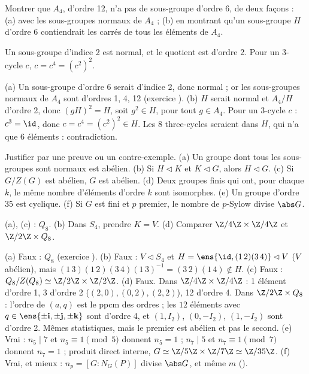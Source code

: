 \begin{exo}\label{exo-a4}
Montrer que $A_4$, d'ordre 12, n'a pas de sous-groupe d'ordre 6, de deux façons : (a) avec les sous-groupes normaux de $A_4$ ; (b) en montrant qu'un sous-groupe $H$ d'ordre 6 contiendrait les carrés de tous les éléments de $A_4$.
\begin{indication}
Un sous-groupe d'indice 2 est normal, et le quotient est d'ordre 2. Pour un 3-cycle $c$, $c=c^4=(c^2)^2$.
\end{indication}
\begin{corrige}
(a) Un sous-groupe d'ordre 6 serait d'indice 2, donc normal ; or les sous-groupes normaux de $A_4$ sont d'ordres 1, 4, 12 (exercice ).
(b) $H$ serait normal et $A_4/H$ d'ordre 2, donc $(gH)^2=H$, soit $g^2\in H$, pour tout $g\in A_4$. Pour un 3-cycle $c$ : $c^3=\id$, donc $c=c^4=(c^2)^2\in H$. Les 8 three-cycles seraient dans $H$, qui n'a que 6 éléments : contradiction.
\end{corrige}
\end{exo}

\begin{exo}\label{exo-vf-groupes}
Justifier par une preuve ou un contre-exemple. (a) Un groupe dont tous les sous-groupes sont normaux est abélien. (b) Si $H\lhd K$ et $K\lhd G$, alors $H\lhd G$. (c) Si $G/Z(G)$ est abélien, $G$ est abélien. (d) Deux groupes finis qui ont, pour chaque $k$, le même nombre d'éléments d'ordre $k$ sont isomorphes. (e) Un groupe d'ordre 35 est cyclique. (f) Si $G$ est fini et $p$ premier, le nombre de $p$-Sylow divise $\abs G$.
\begin{indication}
(a), (c) : $Q_8$. (b) Dans $S_4$, prendre $K=V$. (d) Comparer $\Z/4\Z\times\Z/4\Z$ et $\Z/2\Z\times Q_8$.
\end{indication}
\begin{corrige}
(a) Faux : $Q_8$ (exercice ).
(b) Faux : $V\lhd S_4$ et $H=\ens{\id,(1\,2)(3\,4)}\lhd V$ ($V$ abélien), mais $(1\,3)(1\,2)(3\,4)(1\,3)^{-1}=(3\,2)(1\,4)\notin H$.
(c) Faux : $Q_8/Z(Q_8)\simeq\Z/2\Z\times\Z/2\Z$.
(d) Faux. Dans $\Z/4\Z\times\Z/4\Z$ : 1 élément d'ordre 1, 3 d'ordre 2 ($(2,0),(0,2),(2,2)$), 12 d'ordre 4. Dans $\Z/2\Z\times Q_8$ : l'ordre de $(a,q)$ est le ppcm des ordres ; les $12$ éléments avec $q\in\ens{\pm\mathbf i,\pm\mathbf j,\pm\mathbf k}$ sont d'ordre 4, et $(1,I_2)$, $(0,-I_2)$, $(1,-I_2)$ sont d'ordre 2. Mêmes statistiques, mais le premier est abélien et pas le second.
(e) Vrai : $n_5\mid7$ et $n_5\equiv1\pmod5$ donnent $n_5=1$ ; $n_7\mid5$ et $n_7\equiv1\pmod7$ donnent $n_7=1$ ; produit direct interne, $G\simeq\Z/5\Z\times\Z/7\Z\simeq\Z/35\Z$.
(f) Vrai, et mieux : $n_p=[G:N_G(P)]$ divise $\abs G$, et même $m$ ().
\end{corrige}
\end{exo}

